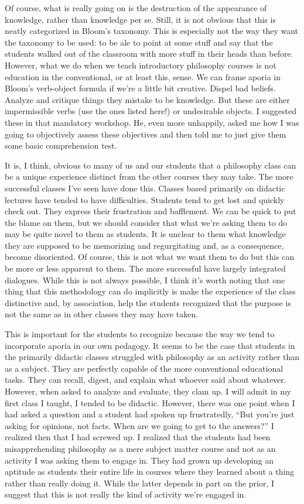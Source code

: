 \documentclass[letterpaper,notitlepage,12pt]{article}
\begin{document}
Of course, what is really going on is the destruction of the appearance of
knowledge, rather than knowledge per se.
Still, it is not obvious that this is neatly categorized in Bloom's taxonomy.
This is especially not the way they want the taxonomy to be used: to be ale to
point at some stuff and say that the students walked out of the classroom with
more stuff in their heads than before.
However, what we do when we teach introductory philosophy courses is not
education in the conventional, or at least this, sense.
We can frame aporia in Bloom's verb-object formula if we're a little bit
creative.
Dispel bad beliefs.
Analyze and critique things they mistake to be knowledge.
But these are either impermissible verbs (use the ones listed here!) or
undesirable objects.
I suggested these in that mandatory workshop.
He, even more unhappily, asked me how I was going to objectively assess these
objectives and then told me to just give them some basic comprehension test.

It is, I think, obvious to many of us and our students that a philosophy class
can be a unique experience distinct from the other courses they may take.
The more successful classes I've seen have done this.
Classes based primarily on didactic lectures have tended to have difficulties.
Students tend to get lost and quickly check out.
They express their frustration and bafflement.
We can be quick to put the blame on them, but we should consider that what we're
asking them to do may be quite novel to them as students.
It is unclear to them what knowledge they are supposed to be memorizing and
regurgitating and, as a consequence, become disoriented.
Of course, this is not what we want them to do but this can be more or less
apparent to them.
The more successful have largely integrated dialogues.
While this is not always possible, I think it's worth noting that one thing that
this methodology can do implicitly is make the experience of the class
distinctive and, by association, help the students recognized that the purpose
is not the same as in other classes they may have taken.

This is important for the students to recognize because the way we tend to
incorporate aporia in our own pedagogy.
It seems to be the case that students in the primarily didactic classes
struggled with philosophy as an activity rather than as a subject.
They are perfectly capable of the more conventional educational tasks.
They can recall, digest, and explain what whoever said about whatever.
However, when asked to analyze and evaluate, they clam up.
I will admit in my first class I taught, I tended to be didactic.
However, there was one point when I had asked a question and a student had
spoken up frustratedly, ``But you're just asking for opinions, not facts. When
are we going to get to the answers?''
I realized then that I had screwed up.
I realized that the students had been misapprehending philosophy as a mere
subject matter course and not as an activity I was asking them to engage in.
They had grown up developing an aptitude as students their entire life in
courses where they learned about a thing rather than really doing it.
While the latter depends in part on the prior, I suggest that this is not really
the kind of activity we're engaged in.
\end{document}
